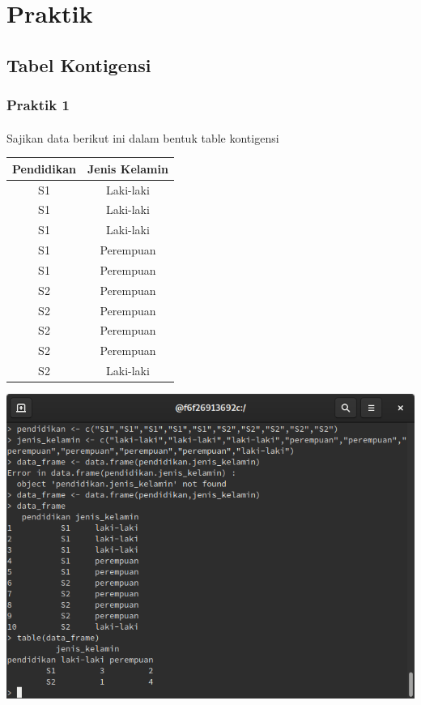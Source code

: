 \documentclass[a4paper,12pt]{article}
\begin{document}
\section{Praktik}
\subsection{Tabel Kontigensi}
\subsubsection{Praktik 1}
\paragraph{}
Sajikan data berikut ini dalam bentuk table kontigensi 
\begin{table}[!ht]
	\begin{tabular}{|c|c|}
		\hline 
		Pendidikan & Jenis Kelamin \\ 
		\hline 
		S1 & Laki-laki \\ 
		\hline 
		S1 & Laki-laki \\ 
		\hline 
		S1 & Laki-laki \\ 
		\hline 
		S1 & Perempuan \\ 
		\hline 
		S1 & Perempuan \\ 
		\hline 
		S2 & Perempuan \\ 
		\hline 
		S2 & Perempuan \\ 
		\hline 
		S2 & Perempuan \\ 
		\hline 
		S2 & Perempuan \\ 
		\hline 
		S2 & Laki-laki \\ 
		\hline 
	\end{tabular}
\end{table} 
\includegraphics[width=\linewidth]{1}
\end{document}
